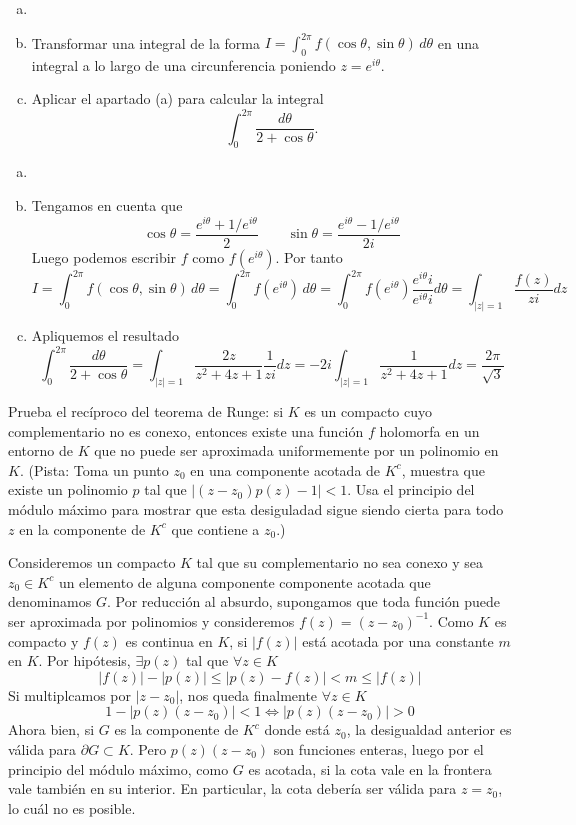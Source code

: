 \documentclass[twoside]{article}
\begin{document}
\newpage
\begin{ejercicio}{8}
\begin{enumerate}[a)]
\item[]
\item Transformar una integral de la forma $I=\int_0^{2\pi} f(\cos\theta,\sin\theta)\,d\theta$ 
en una integral a lo largo de una circunferencia poniendo $z=e^{i\theta}$. 
\item Aplicar el apartado (a) para calcular la integral
\[\int_0^{2\pi}\frac{d\theta}{2+\cos\theta}.\]
\end{enumerate}
\end{ejercicio}
\begin{solucion}
\begin{enumerate}[a)]
\item[]
\item Tengamos en cuenta que 
$$\cos \theta = \frac{e^{i \theta}+1/e^{i\theta}}{2}
\qquad \sin \theta = \frac{e^{i \theta}-1/e^{i\theta}}{2i}$$ 
Luego podemos escribir $f$ como $f(e^{i\theta})$. Por tanto
$$
I = \int_0^{2\pi} f(\cos\theta,\sin\theta)\,d\theta = \int_0^{2\pi} f(e^{i\theta})\,d\theta = \int_0^{2\pi} f(e^{i\theta})\frac{e^{i\theta}i}{e^{i\theta}i} d\theta = \int_{|z|=1} \frac{f(z)}{zi}dz
$$
\item Apliquemos el resultado
$$
\int_0^{2\pi}\frac{d\theta}{2+\cos\theta} = \int_{|z|=1}\frac{2z}{z^2+4z+1}\frac{1}{zi} dz= -2i\int_{|z|=1}\frac{1}{z^2+4z+1} dz = \frac{2\pi}{\sqrt{3}}
$$
\end{enumerate}
\end{solucion}
\newpage
\begin{ejercicio}{9}
Prueba el recíproco del teorema de Runge: si $K$ es un compacto cuyo complementario no es conexo, entonces existe una función $f$ holomorfa en un entorno de $K$ que no puede ser aproximada uniformemente por un polinomio en $K$. (Pista: Toma un punto $z_0$ en una componente acotada de $K^c$, muestra que existe un polinomio $p$ tal que $|(z-z_0)p(z)-1|< 1$. Usa el principio del módulo máximo para mostrar que esta desiguladad sigue siendo cierta para todo $z$ en la componente de $K^c$ que contiene a $z_0$.)
\end{ejercicio}
\begin{solucion}
Consideremos un compacto $K$ tal que su complementario no sea conexo y sea $z_0 \in K^c$ un elemento de alguna componente componente acotada que denominamos $G$. Por reducción al absurdo, supongamos que toda función puede ser aproximada por polinomios y consideremos $f(z)=(z-z_0)^{-1}$. Como $K$ es compacto y $f(z)$ es continua en $K$, si $|f(z)|$ está acotada por una constante $m$ en $K$. Por hipótesis, $\exists p(z)$ tal que $\forall z \in K$
$$
|f(z)|-|p(z)|\leq |p(z)-f(z)| < m \leq |f(z)|
$$
Si multiplcamos por $|z-z_0|$, nos queda finalmente $\forall z \in K$
$$
1-|p(z)(z-z_0)| < 1 \Leftrightarrow |p(z)(z-z_0)|>0
$$
Ahora bien, si $G$ es la componente de $K^c$ donde está $z_0$, la desigualdad anterior es válida para $ \partial G \subset K$. Pero $p(z)(z-z_0)$ son funciones enteras, luego por el principio del módulo máximo, como $G$ es acotada, si la cota vale en la frontera vale también en su interior. En particular, la cota debería ser válida para $z=z_0$, lo cuál no es posible.
\end{solucion}
\end{document}
